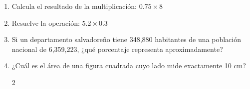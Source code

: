 \documentclass[10pt,a4paper]{article}
\begin{document}
\begin{enumerate}[label=\textbf{\arabic*.}]
\begin{enumerate}[label=\textbf{\Alph*)}]
\end{enumerate}
\vspace{0.15cm}
\item Calcula el resultado de la multiplicación: \(0.75 \times 8\)
\begin{enumerate}[label=\textbf{\Alph*)}]
\end{enumerate}
\vspace{0.15cm}
\item Resuelve la operación: \(5.2 \times 0.3\)
\begin{enumerate}[label=\textbf{\Alph*)}]
\end{enumerate}
\vspace{0.15cm}
\item Si un departamento salvadoreño tiene 348,880 habitantes de una población nacional de 6,359,223, ¿qué porcentaje representa aproximadamente?
\begin{enumerate}[label=\textbf{\Alph*)}]
\end{enumerate}
\vspace{0.15cm}
\item ¿Cuál es el área de una figura cuadrada cuyo lado mide exactamente 10 cm?
\begin{enumerate}[label=\textbf{\Alph*)}]
\begin{multicols}{2}

\end{multicols}
\end{enumerate}
\end{enumerate}
\end{document}
